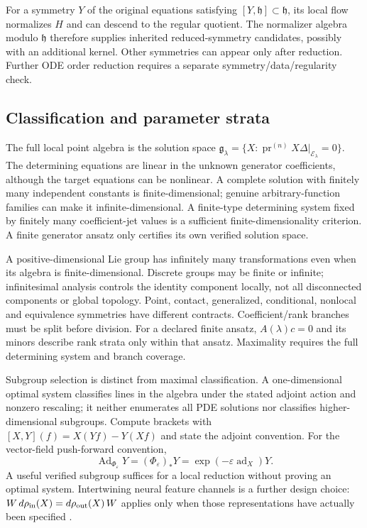 \documentclass[11pt]{article}
\theoremstyle{definition}
\newcommand{\pr}{\operatorname{pr}}
\begin{document}
For a symmetry $Y$ of the original equations satisfying
$[Y,\mathfrak h]\subset\mathfrak h$, its local flow normalizes $H$ and can
descend to the regular quotient. The normalizer algebra modulo $\mathfrak h$
therefore supplies inherited reduced-symmetry candidates, possibly with an
additional kernel. Other symmetries can appear only after reduction. Further
ODE order reduction requires a separate symmetry/data/regularity check.

\subsection{Classification and parameter strata}
\label{sec:classification-core}
The full local point algebra is the solution space
$\mathfrak g_\lambda=\{X:\pr^{(n)}X\Delta|_{\mathcal E_\lambda}=0\}$.
The determining equations are linear in the unknown generator coefficients,
although the target equations can be nonlinear. A complete solution with
finitely many independent constants is finite-dimensional; genuine
arbitrary-function families can make it infinite-dimensional. A finite-type
determining system fixed by finitely many coefficient-jet values is a sufficient
finite-dimensionality criterion. A finite generator ansatz only certifies its
own verified solution space.

A positive-dimensional Lie group has infinitely many transformations even
when its algebra is finite-dimensional. Discrete groups may be finite or
infinite; infinitesimal analysis controls the identity component locally, not
all disconnected components or global topology. Point, contact, generalized,
conditional, nonlocal and equivalence symmetries have different contracts.
Coefficient/rank branches must be split before division. For a declared
finite ansatz, $A(\lambda)c=0$ and its minors describe rank strata only within
that ansatz. Maximality requires the full determining system and branch coverage.

Subgroup selection is distinct from maximal classification. A one-dimensional
optimal system classifies lines in the algebra under the stated adjoint action
and nonzero rescaling; it neither enumerates all PDE solutions nor classifies
higher-dimensional subgroups. Compute brackets with
$[X,Y](f)=X(Yf)-Y(Xf)$ and state the adjoint convention. For the vector-field
push-forward convention,
\begin{equation}
 \operatorname{Ad}_{\Phi_\varepsilon}Y=(\Phi_\varepsilon)_*Y
   =\exp(-\varepsilon\operatorname{ad}_X)Y.
\end{equation}
A useful verified subgroup suffices for a local reduction without proving an
optimal system. Intertwining neural feature channels is a further design choice:
$W\,d\rho_{\rm in}(X)=d\rho_{\rm out}(X)\,W$ applies only when those
representations have actually been specified \cite{otto}.
\end{document}
